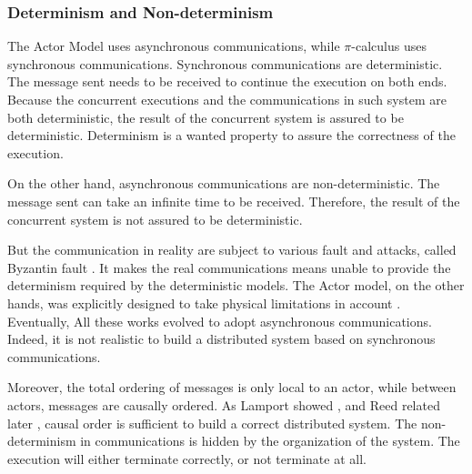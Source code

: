 


\subsubsection{Determinism and Non-determinism}


The Actor Model uses asynchronous communications, while $\pi$-calculus uses synchronous communications.
Synchronous communications are deterministic.
The message sent needs to be received to continue the execution on both ends.
Because the concurrent executions and the communications in such system are both deterministic, the result of the concurrent system is assured to be deterministic.
Determinism is a wanted property to assure the correctness of the execution.

On the other hand, asynchronous communications are non-deterministic.
The message sent can take an infinite time to be received.
Therefore, the result of the concurrent system is not assured to be deterministic.

But the communication in reality are subject to various fault and attacks, called Byzantin fault \cite{Lamport1982}.
It makes the real communications means unable to provide the determinism required by the deterministic models.
The Actor model, on the other hands, was explicitly designed to take physical limitations in account \cite{Hewitt1977a}.
Eventually, All these works evolved to adopt asynchronous communications.
Indeed, it is not realistic to build a distributed system based on synchronous communications.

Moreover, the total ordering of messages is only local to an actor, while between actors, messages are causally ordered.
As Lamport showed \cite{Lamport1978}, and Reed related later \cite{Reed2012}, causal order is sufficient to build a correct distributed system.
The non-determinism in communications is hidden by the organization of the system.
The execution will either terminate correctly, or not terminate at all.





